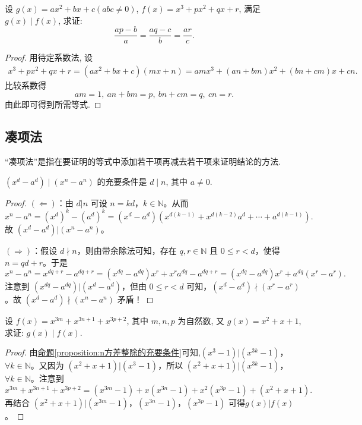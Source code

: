 \documentclass[../../main.tex]{subfiles}%
\begin{document}
\begin{example}
设 \(g(x)=ax^{2}+bx + c(abc\neq0)\), \(f(x)=x^{3}+px^{2}+qx + r\), 满足 \(g(x)\mid f(x)\), 求证:
\[
\frac{ap - b}{a}=\frac{aq - c}{b}=\frac{ar}{c}.
\]
\end{example}
\begin{proof}
用待定系数法, 设
\begin{align*}
x^{3}+px^{2}+qx + r=(ax^{2}+bx + c)(mx + n)
=amx^{3}+(an + bm)x^{2}+(bn + cm)x+cn.
\end{align*}
比较系数得
\[
am = 1,\ an + bm = p,\ bn + cm = q,\ cn = r.
\]
由此即可得到所需等式. 
\end{proof}

\subsection{凑项法}

“凑项法”是指在要证明的等式中添加若干项再减去若干项来证明结论的方法.

\begin{proposition}\label{proposition:n方差整除的充要条件}
\((x^{d}-a^{d}) \mid (x^{n}-a^{n})\) 的充要条件是 \(d\mid n\), 其中 \(a\neq0\).
\end{proposition}
\begin{proof}
$(\Leftarrow)$：由 \(d|n\) 可设 \(n = kd\)，\(k\in \mathbb{N}\)。从而
\[
x^n - a^n=(x^d)^k-(a^d)^k=(x^d - a^d)(x^{d(k - 1)}+x^{d(k - 2)}a^d+\cdots +a^{d(k - 1)}).
\]
故 \((x^d - a^d)|(x^n - a^n)\)。

\((\Rightarrow)\)：假设 \(d\nmid n\)，则由带余除法可知，存在 \(q, r\in \mathbb{N}\) 且 \(0\leqslant r < d\)，使得 \(n = qd + r\)。于是
\[
x^n - a^n=x^{dq + r}-a^{dq + r}=(x^{dq}-a^{dq})x^r+x^ra^{dq}-a^{dq + r}=(x^{dq}-a^{dq})x^r+a^{dq}(x^r - a^r).
\]
注意到 \((x^{dq}-a^{dq})|(x^d - a^d)\)，但由 \(0\leqslant r < d\) 可知，\((x^d - a^d)\nmid (x^r - a^r)\)。故 \((x^d - a^d)\nmid (x^n - a^n)\) 矛盾！
\end{proof}

\begin{example}
设 \(f(x)=x^{3m}+x^{3n + 1}+x^{3p+2}\), 其中 \(m,n,p\) 为自然数, 又 \(g(x)=x^{2}+x + 1\), 求证: \(g(x)\mid f(x)\).
\end{example}
\begin{proof}
由\hyperref[proposition:n方差整除的充要条件]{命题\ref{proposition:n方差整除的充要条件}}可知,\((x^3 - 1)|(x^{3k} - 1)\)，\(\forall k\in \mathbb{N}\)。又因为 \((x^2 + x + 1)|(x^3 - 1)\)，所以 \((x^2 + x + 1)|(x^{3k} - 1)\)，\(\forall k\in \mathbb{N}\)。注意到
\[
x^{3m}+x^{3n + 1}+x^{3p + 2}=(x^{3m}-1)+x(x^{3n}-1)+x^2(x^{3p}-1)+(x^2 + x + 1).
\]
再结合 \((x^2 + x + 1)|(x^{3m}-1)\)，\((x^{3n}-1)\)，\((x^{3p}-1)\) 可得\(g(x)|f(x)\)。
\end{proof}
\end{document}

